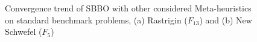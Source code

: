  \begin{figure}
    \centering
{} 
 \caption[Convergence trend of IBBO and SBBO with other considered Meta-heuristics standard benchmark problems]{\fontsize{10pt}{12pt}\selectfont Convergence trend of SBBO with other considered Meta-heuristics on standard benchmark problems, (a) Rastrigin ($F_{13}$) and (b) New Schwefel ($F_5$)}
\label{fig:cg1}
\end{figure}
